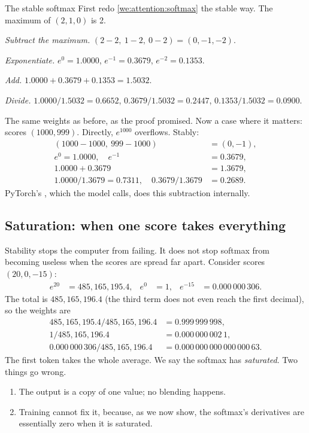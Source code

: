 \begin{worked}[label={we:attention:stable}]{The stable softmax}
First redo \cref{we:attention:softmax} the stable way. The maximum of $(2, 1, 0)$ is 2.

\emph{Subtract the maximum.} $(2-2,\ 1-2,\ 0-2) = (0, -1, -2)$.

\emph{Exponentiate.} $e^{0} = 1.0000$, $e^{-1} = 0.3679$, $e^{-2} = 0.1353$.

\emph{Add.} $1.0000 + 0.3679 + 0.1353 = 1.5032$.

\emph{Divide.} $1.0000/1.5032 = 0.6652$, $0.3679/1.5032 = 0.2447$, $0.1353/1.5032 = 0.0900$.

The same weights as before, as the proof promised. Now a case where it matters: scores
$(1000, 999)$. Directly, $e^{1000}$ overflows. Stably:
\begin{align*}
  (1000 - 1000,\ 999 - 1000) &= (0, -1),\\
  e^{0} = 1.0000,\quad e^{-1} &= 0.3679,\\
  1.0000 + 0.3679 &= 1.3679,\\
  1.0000/1.3679 = 0.7311,\quad 0.3679/1.3679 &= 0.2689.
\end{align*}
PyTorch's , which the model calls, does this subtraction internally.
\end{worked}

\subsection{Saturation: when one score takes everything}\label{sec:attention:saturation}

Stability stops the computer from failing. It does not stop softmax from becoming useless when
the scores are spread far apart. Consider scores $(20, 0, -15)$:
\begin{align*}
  e^{20} &= 485{,}165{,}195.4, & e^{0} &= 1, & e^{-15} &= 0.000\,000\,306 .
\end{align*}
The total is $485{,}165{,}196.4$ (the third term does not even reach the first decimal), so the
weights are
\begin{align*}
  485{,}165{,}195.4 / 485{,}165{,}196.4 &= 0.999\,999\,998,\\
  1 / 485{,}165{,}196.4 &= 0.000\,000\,002\,1,\\
  0.000\,000\,306 / 485{,}165{,}196.4 &= 0.000\,000\,000\,000\,000\,63 .
\end{align*}
The first token takes the whole average. We say the softmax has
\emph{saturated}. Two things go wrong.
\begin{enumerate}
  \item The output is a copy of one value; no blending happens.
  \item Training cannot fix it, because, as we now show, the softmax's derivatives are
  essentially zero when it is saturated.
\end{enumerate}

